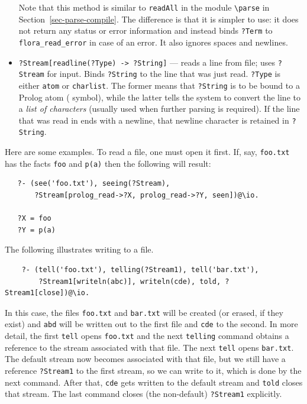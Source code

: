 \documentclass[11pt]{article}
\newcommand{\ERGO}{\mbox{\smaller{\ensuremath{\cal{E}}\smaller{{\sc{RGO}}}}}\xspace}
\newcommand{\FLSYSTEM}{\ERGO}
\newcommand{\bs}{\textbackslash}
\begin{document}
\begin{itemize}
  Note that this method is similar to \texttt{readAll} in the module
  \texttt{\bs{}parse} in Section~\ref{sec-parse-compile}. The difference is
  that it is simpler to use: it does not return any status or error information
  and instead binds \texttt{?Term} to \texttt{flora\_read\_error} in case
  of an error. It also ignores spaces and newlines. 
\item {\tt ?Stream[readline(?Type) -> ?String]} --- reads a line from file;
  uses {\tt ?Stream} for input. Binds \texttt{?String} to the line that was
  just read.  {\tt ?Type} is either
  {\tt atom} or
  {\tt charlist}. The former means that {\tt ?String} is to be bound to a
  Prolog atom (\FLSYSTEM symbol), while
  the latter tells the system to convert the line to a \emph{list of
    characters} (usually used when further parsing is required).  
  If the line that was read in ends with a newline, that newline character is
  retained in \texttt{?String}. 
\end{itemize}

\noindent
Here are some examples.
To read a file, one must open it first. If, say,
\texttt{foo.txt} has the facts \texttt{foo} and \texttt{p(a)} then the
following will result:
\begin{verbatim}
   ?- (see('foo.txt'), seeing(?Stream),
       ?Stream[prolog_read->?X, prolog_read->?Y, seen])@\io.

   ?X = foo
   ?Y = p(a)
\end{verbatim}
The following illustrates writing to a file.
\begin{verbatim}
    ?- (tell('foo.txt'), telling(?Stream1), tell('bar.txt'),
        ?Stream1[writeln(abc)], writeln(cde), told, ?Stream1[close])@\io.
\end{verbatim}
In this case, the files \texttt{foo.txt} and \texttt{bar.txt} will be
created (or erased, if they exist)  and \texttt{abd} will be written out to
the first file and \texttt{cde} to the second.  
In more detail, the first \texttt{tell} opens \texttt{foo.txt} and the next
\texttt{telling} command obtains a reference to the stream associated with
that file. The next \texttt{tell} opens \texttt{bar.txt}. The default
stream now becomes associated with that file, but we still have a reference
\texttt{?Stream1} to the first stream, so we can write to it, which is done
by the next command. After that, \texttt{cde} gets written to the default
stream and \texttt{told} closes that stream. The last command closes (the
non-default) \texttt{?Stream1} explicitly. 
\end{document}
